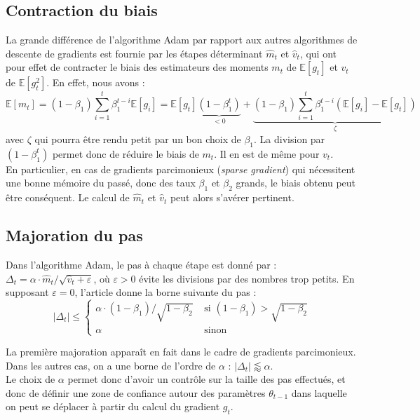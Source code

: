 \documentclass[11pt,a4paper, french]{article}
\newcommand{\dsum}[2]{\displaystyle\sum_{#1}^{#2}}
\begin{document}
\subsection{Contraction du biais}

La grande différence de l'algorithme Adam par rapport aux autres algorithmes de descente de gradients est fournie par les étapes déterminant $\widehat m_t$ et $\widehat v_t$, qui ont pour effet de contracter le biais des estimateurs des moments $m_t$ de $\mathbb E[g_t]$ et $v_t$ de $\mathbb E[g_t^2]$. En effet, nous avons :
$$\mathbb E[m_t]=(1-\beta_1)\dsum{i=1}t\beta_1^{t-i}\mathbb E[g_i]= \mathbb E[g_t]\underset{<0}{\underbrace{(1-\beta_1^t)}}+\underset{\zeta}{\underbrace{(1-\beta_1)\dsum{i=1}t\beta_1^{t-i}(\mathbb E[g_i]-\mathbb E[g_t])}}$$
avec $\zeta$ qui pourra être rendu petit par un bon choix de $\beta_1$. La division par $(1-\beta_1^t)$ permet donc de réduire le biais de $m_t$. Il en est de même pour $v_t$. \\
En particulier, en cas de gradients parcimonieux (\textit{sparse gradient}) qui nécessitent une bonne mémoire du passé, donc des taux $\beta_1$ et $\beta_2$ grands, le biais obtenu peut être conséquent. Le calcul de $\widehat m_t$ et $\widehat v_t$ peut alors s'avérer pertinent.


\subsection{Majoration du pas}

Dans l'algorithme Adam, le pas à chaque étape est donné par : $\Delta_t=\alpha\cdotp \widehat m_t/\sqrt{\widehat v_t+\varepsilon}$, où $\varepsilon>0$ évite les divisions par des nombres trop petits. En supposant $\varepsilon=0$, l'article donne la borne suivante du pas : 
$$|\Delta_t|\leqslant \left\{\begin{array}{ll}
\alpha\cdotp (1-\beta_1)/\sqrt{1-\beta_2} & \text{ si }(1-\beta_1)>\sqrt{1-\beta_2}\\
\alpha & \text{ sinon}
\end{array}\right.
$$

La première majoration apparaît en fait dans le cadre de gradients parcimonieux. Dans les autres cas, on a une borne de l'ordre de $\alpha$ : $|\Delta_t|\lessapprox \alpha$.\\
Le choix de $\alpha$ permet donc d'avoir un contrôle sur la taille des pas effectués, et donc de définir une \og zone de confiance\fg{} autour des paramètres $\theta_{t-1}$ dans laquelle on peut se déplacer à partir du calcul du gradient $g_t$.
\end{document}

